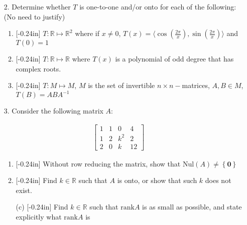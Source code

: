 \documentclass[letterpaper,12pt]{article}
\newcommand{\set}[1]{\left\{ #1 \right\}}
\theoremstyle{definition}
\begin{document}
\pagebreak
\begin{enumerate}
    \item[2.]  Determine whether $T$ is one-to-one and/or onto for each of the following: (No need to justify) \begin{enumerate}
        \item\reversemarginpar{}[-0.24in] $T: \mathbb{R} \mapsto \mathbb{R}^2$ where if $x \neq 0$, $T(x)= \langle\cos\left (\frac{2\pi}{x} \right) ,\sin \left (\frac{2\pi}{x} \right)\rangle$ and $T(0) = 1$
        \vspace{2.4in}
        \item\reversemarginpar{}[-0.24in] $T:\mathbb{R} \mapsto \mathbb{R}$ where $T(x)$ is a polynomial of odd degree that has complex roots.
        \vspace{2.4in}
        \item\reversemarginpar{}[-0.24in] $T: M \mapsto M$, $M$ is the set of invertible $n\times n-$matrices, $A,B \in M$, $T(B) = ABA^{-1}$
    \end{enumerate}
\end{enumerate}
\pagebreak
\begin{enumerate}
    \item[3.] Consider the following matrix $A$: \end{enumerate} \begin{align*}
        \begin{bmatrix}
        1 & 1 & 0 & 4 \\
        1 & 2 & k^2 & 2\\
        2 & 0 & k & 12
    \end{bmatrix}
    \end{align*}
\begin{enumerate}
\item[]
    \begin{enumerate}
        \item\reversemarginpar{}[-0.24in] Without row reducing the matrix, show that $\mathrm{Nul}(A) \neq \set{\mathbf{0}}$
        \vspace{3in}
        \item\reversemarginpar{}[-0.24in] Find $k\in\mathbb{R}$ such that $A$ is onto, or show that such $k$ does not exist.
    \end{enumerate}
\end{enumerate}
\pagebreak
\begin{enumerate}
    \item[] \begin{enumerate}
        \item[(c)]\reversemarginpar{}[-0.24in] Find $k\in\mathbb{R}$ such that $\mathrm{rank}A$ is as small as possible, and state explicitly what $\mathrm{rank}A$ is
    \end{enumerate}
\end{enumerate}
\pagebreak
\end{document}
